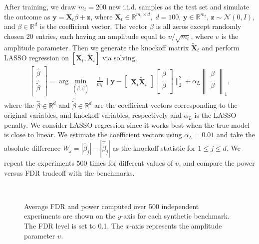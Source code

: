 \documentclass{article}
\theoremstyle{definition}
\begin{document}
After training, we draw $m_t =200$ new i.i.d. samples as the test set and simulate the outcome as $\bm y = \mathbf X_t\beta+ \bm z$, where $\mathbf X_t\in \mathbb R^{m_t\times d},\; d=100$, $\bm y\in \mathbb R^{m_t}$, $\bm z\sim \mathcal N(0, I)$, and $\beta\in \mathbb R^d$ is the coefficient vector.  The vector $\beta$ is all zeros except randomly chosen 20 entries, each having an amplitude equal to $\upsilon/\sqrt{m_t}$, where $\upsilon$ is the amplitude parameter. Then we generate the knockoff matrix $\mathbf {\tilde X}_t$ and perform LASSO regression \cite{friedman2010regularization} on $[\mathbf X_t, \mathbf{\tilde X}_t]$ via solving,
\begin{align*}
    \begin{bmatrix}
    \hat \beta\\ \hat {\tilde \beta}\\
    \end{bmatrix} = \arg \min_{( \beta,  \tilde \beta)}& \frac{1}{m_t} \Big \|\bm y - \begin{bmatrix}
    \mathbf X_{t}\mathbf {\tilde X}_{t}
    \end{bmatrix}
    \begin{bmatrix}
    \beta\\ \tilde \beta\\
    \end{bmatrix}\Big\|_2^2 + \alpha_L  \begin{Vmatrix}
    \beta\\ \tilde {\beta}\\
    \end{Vmatrix}_1, 
\end{align*}
where the $\hat {\beta}\in\mathbb R^d$ and $\hat{\tilde \beta}\in\mathbb R^d$ are the coefficient vectors corresponding to the original variables, and knockoff variables, respectively and $\alpha_L$ is the LASSO penalty. We consider LASSO regression since it  works best when the true model is close to linear. We estimate the coefficient vectors using $\alpha_L = 0.01$ and take the absolute difference {\small $W_j = |\hat \beta_j|- |\hat{\tilde \beta}_j|$} as the knockoff statistic for $1\leq j\leq d$. We repeat the experiments $500$ times for different values of $\upsilon$, and compare the power versus FDR tradeoff with the benchmarks. 
\begin{figure}[htbp]
\centering
  \quad
  \\
    \quad
    \caption{Average FDR and power computed over 500 independent experiments are shown on the $y$-axis  for each synthetic benchmark. The FDR level is set to 0.1.  The $x$-axis represents the amplitude parameter $\upsilon$.}
    \label{fig:knockoff}
\end{figure}
\vspace{-4mm}
\end{document}
